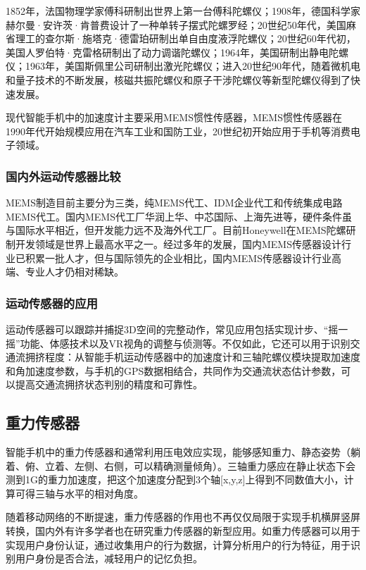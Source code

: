 \documentclass[lang=cn]{elegantpaper}
\begin{document}
1852年，法国物理学家傅科研制出世界上第一台傅科陀螺仪；1908年，德国科学家赫尔曼·安许茨·肯普费设计了一种单转子摆式陀螺罗经；20世纪50年代，美国麻省理工的查尔斯·施塔克·德雷珀研制出单自由度液浮陀螺仪；20世纪60年代初，美国人罗伯特·克雷格研制出了动力调谐陀螺仪；1964年，美国研制出静电陀螺仪；1963年，美国斯佩里公司研制出激光陀螺仪；进入20世纪90年代，随着微机电和量子技术的不断发展，核磁共振陀螺仪和原子干涉陀螺仪等新型陀螺仪得到了快速发展。

现代智能手机中的加速度计主要采用MEMS惯性传感器，MEMS惯性传感器在1990年代开始规模应用在汽车工业和国防工业，20世纪初开始应用于手机等消费电子领域。

\subsubsection{国内外运动传感器比较}

MEMS制造目前主要分为三类，纯MEMS代工、IDM企业代工和传统集成电路MEMS代工。国内MEMS代工厂华润上华、中芯国际、上海先进等，硬件条件虽与国际水平相近，但开发能力远不及海外代工厂。目前Honeywell在MEMS陀螺研制开发领域是世界上最高水平之一。经过多年的发展，国内MEMS传感器设计行业已积累一批人才，但与国际领先的企业相比，国内MEMS传感器设计行业高端、专业人才仍相对稀缺。

\subsubsection{运动传感器的应用}

运动传感器可以跟踪并捕捉3D空间的完整动作，常见应用包括实现计步、“摇一摇”功能、体感技术以及VR视角的调整与侦测等。不仅如此，它还可以用于识别交通流拥挤程度：从智能手机运动传感器中的加速度计和三轴陀螺仪模块提取加速度和角加速度参数，与手机的GPS数据相结合，共同作为交通流状态估计参数，可以提高交通流拥挤状态判别的精度和可靠性。\cite{DetectTrafiic}

\subsection{重力传感器}

智能手机中的重力传感器和通常利用压电效应实现，能够感知重力、静态姿势（躺着、俯、立着、左侧、右侧，可以精确测量倾角）。三轴重力感应在静止状态下会测到1G的重力加速度，把这个加速度分配到3个轴[x,y,z]上得到不同数值大小，计算可得三轴与水平的相对角度。\cite{GSensorTraditionnalUsage}

随着移动网络的不断提速，重力传感器的作用也不再仅仅局限于实现手机横屏竖屏转换，国内外有许多学者也在研究重力传感器的新型应用。如重力传感器可以用于实现用户身份认证，通过收集用户的行为数据，计算分析用户的行为特征，用于识别用户身份是否合法，减轻用户的记忆负担。\cite{GSensorUsage}
\end{document}
